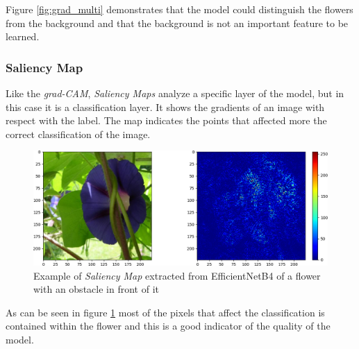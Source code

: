 Figure \ref{fig:grad_multi} demonstrates that the model could distinguish the flowers from the background and that the background is not an important 
feature to be learned.


\subsubsection{Saliency Map}
Like the \textit{grad-CAM}, \textit{Saliency Maps} analyze a specific layer of the model, but in this case it is a classification layer. It shows the gradients of
an image with respect with the label. The map indicates the points that affected more the correct classification of the image.
\begin{figure}[ht!]
\centering
\includegraphics[width=1\textwidth]{images/sal3.png} 
\caption{Example of \textit{Saliency Map} extracted from EfficientNetB4 of a flower with an obstacle in front of it}
\label{fig:sal}
\end{figure}

As can be seen in figure \ref{fig:sal} most of the pixels that affect the
classification is contained within the flower and this is a good indicator
of the quality of the model.







